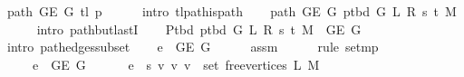 \begin{isabellebody}
\ {\isachardoublequoteopen}path\ {\isacharparenleft}{\kern0pt}G{\isachardot}{\kern0pt}E\ {\isacharquery}{\kern0pt}G{\isacharparenright}{\kern0pt}\ {\isacharparenleft}{\kern0pt}tl\ {\isacharquery}{\kern0pt}p{\isacharparenright}{\kern0pt}{\isachardoublequoteclose}\isanewline
\ \ \ \ \isamarkupfalse%
\ {\isacharparenleft}{\kern0pt}intro\ tl{\isacharunderscore}{\kern0pt}path{\isacharunderscore}{\kern0pt}is{\isacharunderscore}{\kern0pt}path{\isacharparenright}{\kern0pt}\isanewline
\ \ \isamarkupfalse%
\ {\isachardoublequoteopen}path\ {\isacharparenleft}{\kern0pt}G{\isachardot}{\kern0pt}E\ {\isacharquery}{\kern0pt}G{\isacharparenright}{\kern0pt}\ {\isacharparenleft}{\kern0pt}p{\isacharunderscore}{\kern0pt}tbd\ G\ L\ R\ s\ t\ M{\isacharparenright}{\kern0pt}{\isachardoublequoteclose}\isanewline
\ \ \ \ \isamarkupfalse%
\ {\isacharparenleft}{\kern0pt}intro\ path{\isacharunderscore}{\kern0pt}butlastI{\isacharparenright}{\kern0pt}\isanewline
\ \ \isamarkupfalse%
\ {\isachardoublequoteopen}P{\isacharunderscore}{\kern0pt}tbd\ {\isacharparenleft}{\kern0pt}p{\isacharunderscore}{\kern0pt}tbd\ G\ L\ R\ s\ t\ M{\isacharparenright}{\kern0pt}\ {\isasymsubseteq}\ G{\isachardot}{\kern0pt}E\ {\isacharquery}{\kern0pt}G{\isachardoublequoteclose}\isanewline
\ \ \ \ \isamarkupfalse%
\ {\isacharparenleft}{\kern0pt}intro\ path{\isacharunderscore}{\kern0pt}edges{\isacharunderscore}{\kern0pt}subset{\isacharparenright}{\kern0pt}\isanewline
\ \ \isamarkupfalse%
\ {\isachardoublequoteopen}e\ {\isasymin}\ G{\isachardot}{\kern0pt}E\ {\isacharquery}{\kern0pt}G{\isachardoublequoteclose}\isanewline
\ \ \ \ \isamarkupfalse%
\ assm\isanewline
\ \ \ \ \isamarkupfalse%
\ {\isacharparenleft}{\kern0pt}rule\ set{\isacharunderscore}{\kern0pt}mp{\isacharparenright}{\kern0pt}\isanewline
\ \ \isamarkupfalse%
\ \isamarkupfalse%
\isanewline
\ \ \ \ {\isacharparenleft}{\kern0pt}{}{\isacharparenright}{\kern0pt}\ {\isachardoublequoteopen}e\ {\isasymin}\ G{\isachardot}{\kern0pt}E\ G{\isachardoublequoteclose}\ {\isacharbar}{\kern0pt}\isanewline
\ \ \ \ {\isacharparenleft}{\kern0pt}{}{\isacharparenright}{\kern0pt}\ {\isachardoublequoteopen}e\ {\isasymin}\ {\isacharbraceleft}{\kern0pt}{\isacharbraceleft}{\kern0pt}s{\isacharcomma}{\kern0pt}\ v{\isacharbraceright}{\kern0pt}\ {\isacharbar}{\kern0pt}v{\isachardot}{\kern0pt}\ v\ {\isasymin}\ set\ {\isacharparenleft}{\kern0pt}free{\isacharunderscore}{\kern0pt}vertices\ L\ M{\isacharparenright}{\kern0pt}{\isacharbraceright}{\kern0pt}{\isachardoublequoteclose}\ {\isacharbar}{\kern0pt}\isanewline

\end{isabellebody}
